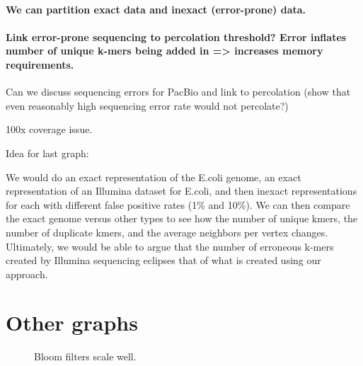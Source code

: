\documentclass[12pt]{article} \usepackage{simplemargins}
\begin{document}
\paragraph{We can partition exact data and inexact (error-prone) data.}

\paragraph{Link error-prone sequencing to percolation threshold?  Error inflates number of unique k-mers being added in => increases memory requirements.}

Can we discuss sequencing errors for PacBio and link to percolation (show
that even reasonably high sequencing error rate would not percolate?)

100x coverage issue.

Idea for last graph:

We would do an exact representation of the E.coli genome, an exact 
representation of an Illumina dataset for E.coli, and then inexact
representations for each with different false positive rates (1\% and
10\%). We can then compare the exact genome versus other types to see
how the number of unique kmers, the number of duplicate kmers, and the
average neighbors per vertex changes. Ultimately, we would be able to
argue that the number of erroneous k-mers created by Illumina
sequencing eclipses that of what is created using our approach.

\section{Other graphs}

\begin{figure}
\caption{Bloom filters scale well.}
\end{figure}
\end{document}
